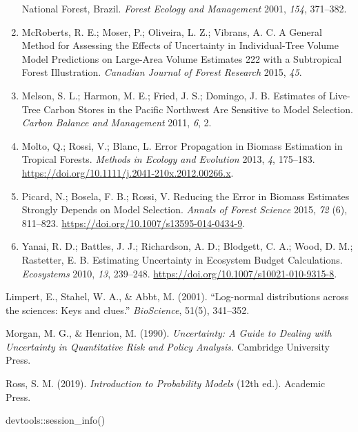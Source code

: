 \documentclass[
]{article}
\newenvironment{Shaded}{}{}
\newcommand{\FunctionTok}[1]{\textcolor[rgb]{0.02,0.16,0.49}{#1}}
\newcommand{\NormalTok}[1]{#1}
\newcommand{\SpecialCharTok}[1]{\textcolor[rgb]{0.25,0.44,0.63}{#1}}
\begin{document}
\begin{enumerate}
  National Forest, Brazil. \emph{Forest Ecology and Management} 2001,
  \emph{154}, 371--382.
\item
  McRoberts, R. E.; Moser, P.; Oliveira, L. Z.; Vibrans, A. C. A General
  Method for Assessing the Effects of Uncertainty in Individual-Tree
  Volume Model Predictions on Large-Area Volume Estimates 222 with a
  Subtropical Forest Illustration. \emph{Canadian Journal of Forest
  Research} 2015, \emph{45}.
\item
  Melson, S. L.; Harmon, M. E.; Fried, J. S.; Domingo, J. B. Estimates
  of Live-Tree Carbon Stores in the Pacific Northwest Are Sensitive to
  Model Selection. \emph{Carbon Balance and Management} 2011, \emph{6},
  2.
\item
  Molto, Q.; Rossi, V.; Blanc, L. Error Propagation in Biomass
  Estimation in Tropical Forests. \emph{Methods in Ecology and
  Evolution} 2013, \emph{4}, 175--183.
  \url{https://doi.org/10.1111/j.2041-210x.2012.00266.x}.
\item
  Picard, N.; Bosela, F. B.; Rossi, V. Reducing the Error in Biomass
  Estimates Strongly Depends on Model Selection. \emph{Annals of Forest
  Science} 2015, \emph{72} (6), 811--823.
  \url{https://doi.org/10.1007/s13595-014-0434-9}.
\item
  Yanai, R. D.; Battles, J. J.; Richardson, A. D.; Blodgett, C. A.;
  Wood, D. M.; Rastetter, E. B. Estimating Uncertainty in Ecosystem
  Budget Calculations. \emph{Ecosystems} 2010, \emph{13}, 239--248.
  \url{https://doi.org/10.1007/s10021-010-9315-8}.
\end{enumerate}

Limpert, E., Stahel, W. A., \& Abbt, M. (2001). ``Log-normal
distributions across the sciences: Keys and clues.'' \emph{BioScience},
51(5), 341--352.

Morgan, M. G., \& Henrion, M. (1990). \emph{Uncertainty: A Guide to
Dealing with Uncertainty in Quantitative Risk and Policy Analysis.}
Cambridge University Press.

Ross, S. M. (2019). \emph{Introduction to Probability Models} (12th
ed.). Academic Press.

\begin{Shaded}
\begin{Highlighting}[numbers=left,,]
\NormalTok{devtools}\SpecialCharTok{::}\FunctionTok{session\_info}\NormalTok{()}
\end{Highlighting}
\end{Shaded}
\end{document}
